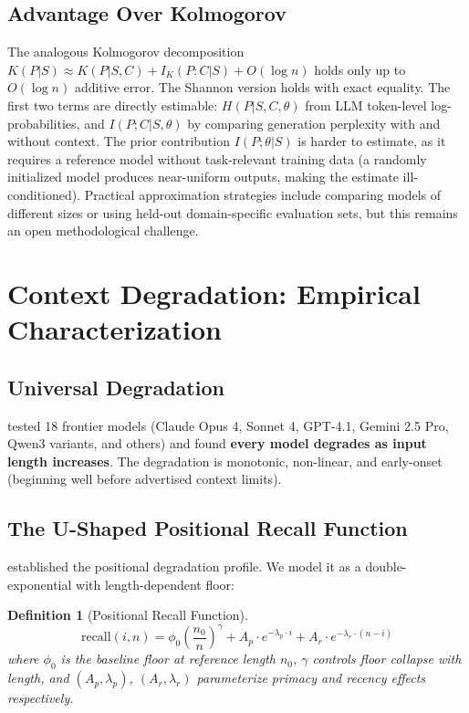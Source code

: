 \documentclass[11pt, a4paper, copyright]{googledeepmind}
\newtheorem{definition}{Definition}[section]
\begin{document}
\subsection{Advantage Over Kolmogorov}

The analogous Kolmogorov decomposition $K(P|S) \approx K(P|S,C) + I_K(P:C|S) + O(\log n)$ holds only up to $O(\log n)$ additive error. The Shannon version holds with exact equality. The first two terms are directly estimable: $H(P|S,C,\theta)$ from LLM token-level log-probabilities, and $I(P;C|S,\theta)$ by comparing generation perplexity with and without context. The prior contribution $I(P;\theta|S)$ is harder to estimate, as it requires a reference model without task-relevant training data (a randomly initialized model produces near-uniform outputs, making the estimate ill-conditioned). Practical approximation strategies include comparing models of different sizes or using held-out domain-specific evaluation sets, but this remains an open methodological challenge.


\section{Context Degradation: Empirical Characterization}
\label{sec:degradation}

\subsection{Universal Degradation}

\citet{chroma2025contextrot} tested 18 frontier models (Claude Opus 4, Sonnet 4, GPT-4.1, Gemini 2.5 Pro, Qwen3 variants, and others) and found \textbf{every model degrades as input length increases}. The degradation is monotonic, non-linear, and early-onset (beginning well before advertised context limits).

\subsection{The U-Shaped Positional Recall Function}

\citet{liu2024lost} established the positional degradation profile. We model it as a double-exponential with length-dependent floor:

\begin{definition}[Positional Recall Function]
\label{def:recall}
$$\text{recall}(i, n) = \phi_0 \left(\frac{n_0}{n}\right)^{\!\gamma} + A_p \cdot e^{-\lambda_p \cdot i} + A_r \cdot e^{-\lambda_r \cdot (n - i)}$$
where $\phi_0$ is the baseline floor at reference length $n_0$, $\gamma$ controls floor collapse with length, and $(A_p, \lambda_p)$, $(A_r, \lambda_r)$ parameterize primacy and recency effects respectively.
\end{definition}
\end{document}
